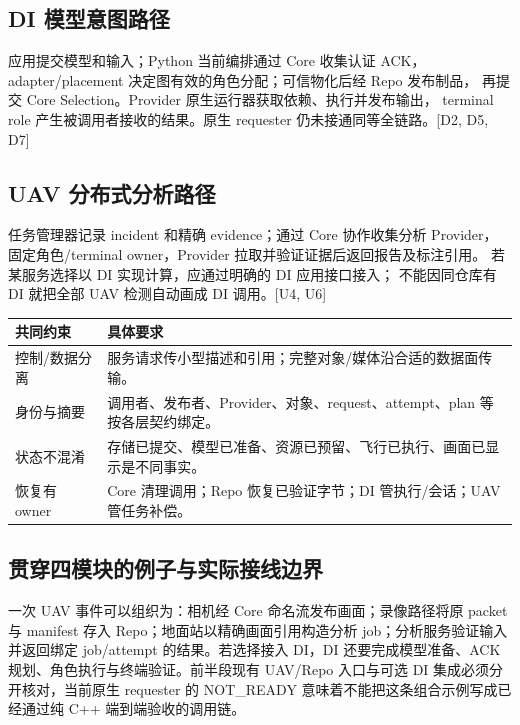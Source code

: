\subsection{DI 模型意图路径}
应用提交模型和输入；Python 当前编排通过 Core 收集认证 ACK，
adapter/placement 决定图有效的角色分配；可信物化后经 Repo 发布制品，
再提交 Core Selection。Provider 原生运行器获取依赖、执行并发布输出，
terminal role 产生被调用者接收的结果。原生 requester 仍未接通同等全链路。[D2, D5, D7]

\subsection{UAV 分布式分析路径}
任务管理器记录 incident 和精确 evidence；通过 Core 协作收集分析 Provider，
固定角色/terminal owner，Provider 拉取并验证证据后返回报告及标注引用。
若某服务选择以 DI 实现计算，应通过明确的 DI 应用接口接入；
不能因同仓库有 DI 就把全部 UAV 检测自动画成 DI 调用。[U4, U6]

\begin{tabularx}{\linewidth}{@{}p{34mm}X@{}}
\toprule
共同约束 & 具体要求 \\
\midrule
控制/数据分离 & 服务请求传小型描述和引用；完整对象/媒体沿合适的数据面传输。\\
身份与摘要 & 调用者、发布者、Provider、对象、request、attempt、plan 等按各层契约绑定。\\
状态不混淆 & 存储已提交、模型已准备、资源已预留、飞行已执行、画面已显示是不同事实。\\
恢复有 owner & Core 清理调用；Repo 恢复已验证字节；DI 管执行/会话；UAV 管任务补偿。\\
\bottomrule
\end{tabularx}


\subsection{贯穿四模块的例子与实际接线边界}
一次 UAV 事件可以组织为：相机经 Core 命名流发布画面；录像路径将原 packet 与 manifest 存入 Repo；地面站以精确画面引用构造分析 job；分析服务验证输入并返回绑定 job/attempt 的结果。若选择接入 DI，DI 还要完成模型准备、ACK 规划、角色执行与终端验证。前半段现有 UAV/Repo 入口与可选 DI 集成必须分开核对，当前原生 requester 的 NOT\_READY 意味着不能把这条组合示例写成已经通过纯 C++ 端到端验收的调用链。

\newpage

